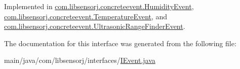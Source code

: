 Implemented in \hyperlink{classcom_1_1libsensorj_1_1concreteevent_1_1HumidityEvent_ad3d8c57f1934c115f0c9374394d9a601}{com.\+libsensorj.\+concreteevent.\+Humidity\+Event}, \hyperlink{classcom_1_1libsensorj_1_1concreteevent_1_1TemperatureEvent_ac0fe5a9964739808ece4fc9f2562dca5}{com.\+libsensorj.\+concreteevent.\+Temperature\+Event}, and \hyperlink{classcom_1_1libsensorj_1_1concreteevent_1_1UltrasonicRangeFinderEvent_a4d1ba316d1d324c4fb6e321e4c7a7b6e}{com.\+libsensorj.\+concreteevent.\+Ultrasonic\+Range\+Finder\+Event}.



The documentation for this interface was generated from the following file\+:\begin{DoxyCompactItemize}
\item 
main/java/com/libsensorj/interfaces/\hyperlink{IEvent_8java}{I\+Event.\+java}\end{DoxyCompactItemize}
